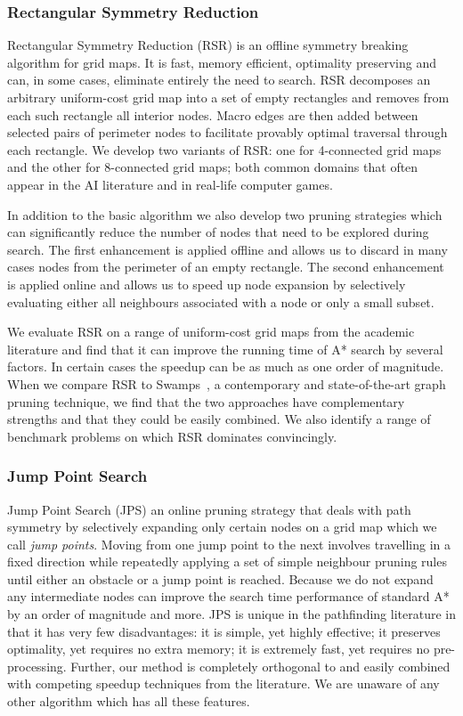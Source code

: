 \subsubsection{Rectangular Symmetry Reduction}
\label{cha::intro::contributions::rsr}
Rectangular Symmetry Reduction (RSR) is an offline symmetry breaking algorithm
for grid maps. It is fast, memory efficient, optimality preserving and can, in
some cases, eliminate entirely the need to search.  RSR decomposes an
arbitrary uniform-cost grid map into a set of empty rectangles and removes
from each such rectangle all interior nodes.  Macro edges are then added
between selected pairs of perimeter nodes to facilitate provably optimal
traversal through each rectangle.  We develop two variants of RSR: one for
4-connected grid maps and the other for 8-connected grid maps; both common
domains that often appear in the AI literature and in real-life computer
games.

In addition to the basic algorithm we also develop two pruning strategies
which can significantly reduce the number of nodes that need to be explored
during search.  The first enhancement is applied offline and allows us to
discard in many cases nodes from the perimeter of an empty rectangle. The
second enhancement is applied online and allows us to speed up node expansion
by selectively evaluating either all neighbours associated with a node or only
a small subset.

We evaluate RSR on a range of uniform-cost grid maps from the academic
literature and find that it can improve the running time of A{*} search by
several factors. In certain cases the speedup can be as much as one order of
magnitude. When we compare RSR to Swamps~\citep{pochter10}, a contemporary and
state-of-the-art graph pruning technique, we find that the two approaches have
complementary strengths and that they could be easily combined. We also
identify a range of benchmark problems on which RSR dominates convincingly.

\subsubsection{Jump Point Search}
\label{cha::intro::contributions::jps}
Jump Point Search (JPS) an online pruning strategy that deals with path
symmetry by selectively expanding only certain nodes on a grid map which we
call \emph{jump points}.  Moving from one jump point to the next involves
travelling in a fixed direction while repeatedly applying a set of simple
neighbour pruning rules until either an obstacle or a jump point is reached.
Because we do not expand any intermediate nodes can improve the search time
performance of standard A{*} by an order of magnitude and more.  JPS is unique
in the pathfinding literature in that it has very few disadvantages: it is
simple, yet highly effective; it preserves optimality, yet requires no extra
memory;  it is extremely fast, yet requires no pre-processing.  Further, our
method is completely orthogonal to and easily combined with competing speedup
techniques from the literature.  We are unaware of any other algorithm which
has all these features.

